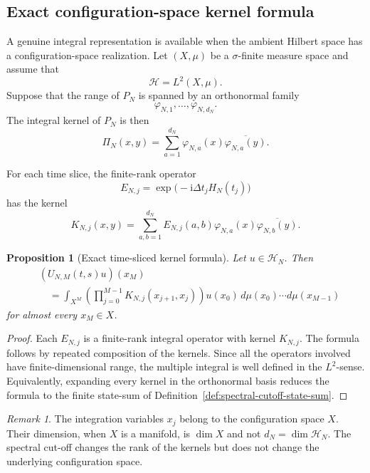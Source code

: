 \documentclass[11pt]{amsart}
\theoremstyle{plain}
\newtheorem{proposition}[theorem]{Proposition}
\theoremstyle{definition}
\theoremstyle{remark}
\newtheorem{remark}[theorem]{Remark}
\begin{document}
\subsection{Exact configuration-space kernel formula}
\label{subsec:configuration-space-kernel}

A genuine integral representation is available when the ambient Hilbert space
has a configuration-space realization. Let \((X,\mu)\) be a
\(\sigma\)-finite measure space and assume that
\[
\mathcal{H}=L^{2}(X,\mu).
\]
Suppose that the range of \(P_{N}\) is spanned by an orthonormal family
\[
\varphi_{N,1},\ldots,\varphi_{N,d_{N}}.
\]
The integral kernel of \(P_{N}\) is then
\[
\Pi_{N}(x,y)
=
\sum_{a=1}^{d_{N}}
\varphi_{N,a}(x)\overline{\varphi_{N,a}(y)}.
\]

For each time slice, the finite-rank operator
\[
E_{N,j}
=
\exp\bigl(-\mathrm{i}\Delta t_{j}H_{N}(t_{j})\bigr)
\]
has the kernel
\[
K_{N,j}(x,y)
=
\sum_{a,b=1}^{d_{N}}
E_{N,j}(a,b)
\varphi_{N,a}(x)\overline{\varphi_{N,b}(y)}.
\]

\begin{proposition}[Exact time-sliced kernel formula]
\label{prop:exact-time-sliced-kernel}
Let \(u\in\mathcal{H}_{N}\). Then
\[
\begin{split}
&(U_{N,M}(t,s)u)(x_{M})
\\
&\quad=
\int_{X^{M}}
\left(
\prod_{j=0}^{M-1}
K_{N,j}(x_{j+1},x_{j})
\right)
u(x_{0})\,
d\mu(x_{0})\cdots d\mu(x_{M-1})
\end{split}
\]
for almost every \(x_{M}\in X\).
\end{proposition}

\begin{proof}
Each \(E_{N,j}\) is a finite-rank integral operator with kernel \(K_{N,j}\).
The formula follows by repeated composition of the kernels. Since all the
operators involved have finite-dimensional range, the multiple integral is
well defined in the \(L^{2}\)-sense. Equivalently, expanding every kernel in
the orthonormal basis reduces the formula to the finite state-sum of
Definition~\ref{def:spectral-cutoff-state-sum}.
\end{proof}

\begin{remark}
\label{rem:dimension-configuration-space}
The integration variables \(x_{j}\) belong to the configuration space \(X\).
Their dimension, when \(X\) is a manifold, is \(\dim X\) and not
\(d_{N}=\dim\mathcal{H}_{N}\). The spectral cut-off changes the rank of the
kernels but does not change the underlying configuration space.
\end{remark}
\end{document}
